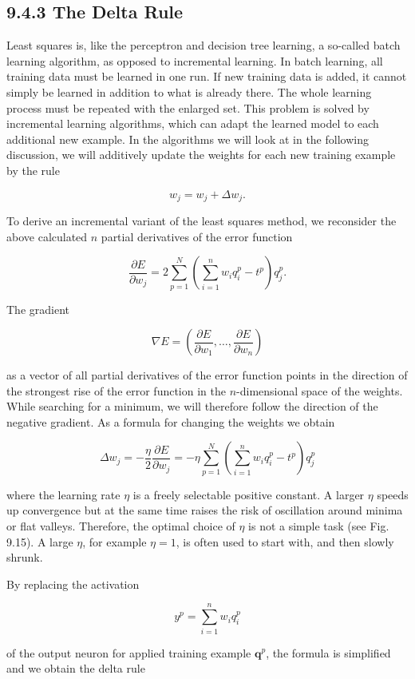 \documentclass[10pt]{book}
\begin{document}
\begin{center}
\begin{enumerate}
\begin{center}
\begin{center}
\begin{center}
\subsection*{9.4.3 The Delta Rule}
Least squares is, like the perceptron and decision tree learning, a so-called batch learning algorithm, as opposed to incremental learning. In batch learning, all training data must be learned in one run. If new training data is added, it cannot simply be learned in addition to what is already there. The whole learning process must be repeated with the enlarged set. This problem is solved by incremental learning algorithms, which can adapt the learned model to each additional new example. In the algorithms we will look at in the following discussion, we will additively update the weights for each new training example by the rule

$$
w_{j}=w_{j}+\Delta w_{j} .
$$

To derive an incremental variant of the least squares method, we reconsider the above calculated $n$ partial derivatives of the error function

$$
\frac{\partial E}{\partial w_{j}}=2 \sum_{p=1}^{N}\left(\sum_{i=1}^{n} w_{i} q_{i}^{p}-t^{p}\right) q_{j}^{p} .
$$

The gradient

$$
\nabla E=\left(\frac{\partial E}{\partial w_{1}}, \ldots, \frac{\partial E}{\partial w_{n}}\right)
$$

as a vector of all partial derivatives of the error function points in the direction of the strongest rise of the error function in the $n$-dimensional space of the weights. While searching for a minimum, we will therefore follow the direction of the negative gradient. As a formula for changing the weights we obtain

$$
\Delta w_{j}=-\frac{\eta}{2} \frac{\partial E}{\partial w_{j}}=-\eta \sum_{p=1}^{N}\left(\sum_{i=1}^{n} w_{i} q_{i}^{p}-t^{p}\right) q_{j}^{p}
$$

where the learning rate $\eta$ is a freely selectable positive constant. A larger $\eta$ speeds up convergence but at the same time raises the risk of oscillation around minima or flat valleys. Therefore, the optimal choice of $\eta$ is not a simple task (see Fig. 9.15). A large $\eta$, for example $\eta=1$, is often used to start with, and then slowly shrunk.

By replacing the activation

$$
y^{p}=\sum_{i=1}^{n} w_{i} q_{i}^{p}
$$

of the output neuron for applied training example $\boldsymbol{q}^{p}$, the formula is simplified and we obtain the delta rule


\end{center}
\end{center}
\end{center}
\end{enumerate}
\end{center}
\end{document}
